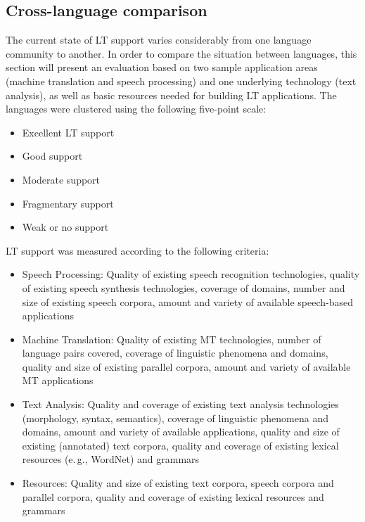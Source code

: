 \begin{multicols}{2}
 \subsection {Cross-language comparison}
   
The current state of LT support varies considerably from one language community to another. In order to compare the situation between languages, this section will present an evaluation based on two sample application areas (machine translation and speech processing) and one underlying technology (text analysis), as well as basic resources needed for building LT applications. 
The languages were clustered using the following five-point scale: 

    \begin{itemize}
      \item Excellent LT support
      \item Good support
      \item Moderate support
      \item Fragmentary support 
      \item Weak or no support
    \end{itemize}

LT support was measured according to the following criteria:
\begin{itemize}
\item Speech Processing: Quality of existing speech recognition technologies, quality of existing speech synthesis technologies, coverage of domains, number and size of existing speech corpora, amount and variety of available speech-based applications
\item Machine Translation: Quality of existing MT technologies, number of language pairs covered, coverage of linguistic phenomena and domains, quality and size of existing parallel corpora, amount and variety of available MT applications
\item Text Analysis: Quality and coverage of existing text analysis technologies (morphology, syntax, semantics), coverage of linguistic phenomena and domains, amount and variety of available applications, quality and size of existing (annotated) text corpora, quality and coverage of existing lexical resources (e.\,g., WordNet) and grammars
\item Resources: Quality and size of existing text corpora, speech corpora and parallel corpora, quality and coverage of existing lexical resources and grammars
\end{itemize} 





\end{multicols}
